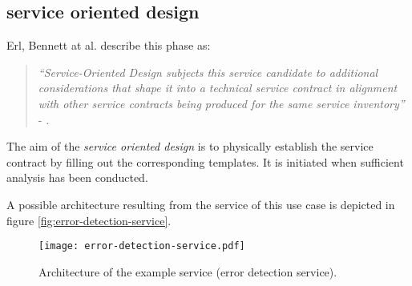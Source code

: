 \subsection{service oriented design}

Erl, Bennett at al. describe this phase as:
\begin{quote}
\emph{``Service-Oriented Design subjects this service candidate to additional considerations that shape it into a technical service contract in alignment with other service contracts being produced for the same service inventory''} - \cite[p.86]{erl2011}.
\end{quote}


The aim of the \emph{service oriented design} is to physically establish the service contract by filling out the corresponding templates. It is initiated when sufficient analysis has been conducted. 



\begin{mdframed}
A possible architecture resulting from the service of this use case is depicted in figure \ref{fig:error-detection-service}. 
\end{mdframed}

\begin{figure}[ht]
\centering
\caption{Architecture of the example service (error detection service).}
\label{fig:example-service-architecture}
\texttt{[image: error-detection-service.pdf]}
\end{figure}